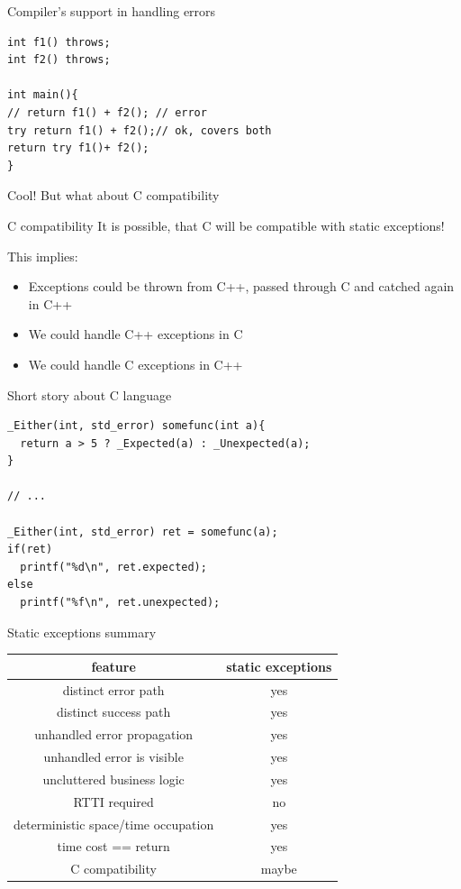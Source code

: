 \documentclass[10pt]{beamer}
\begin{document}
\begin{frame}[fragile]{Compiler's support in handling errors}
	\begin{verbatim}
int f1() throws;	
int f2() throws;

int main(){
// return f1() + f2(); // error
try return f1() + f2();// ok, covers both 
return try f1()+ f2();
}
	\end{verbatim}
\end{frame}

\begin{frame}{Cool! But what about C compatibility}
	\begin{alertblock}{C compatibility}
 		It is possible, that C will be compatible with static exceptions!
	\end{alertblock}

	
	This implies:
	
	\begin{itemize}
		\item Exceptions could be thrown from C++, passed through C and catched again in C++
		\item We could handle C++ exceptions in C
		\item We could handle C exceptions in C++
	\end{itemize}
\end{frame}

\begin{frame}[fragile]{Short story about C language}
	\begin{verbatim}
_Either(int, std_error) somefunc(int a){
  return a > 5 ? _Expected(a) : _Unexpected(a);
}

// ...

_Either(int, std_error) ret = somefunc(a);
if(ret)
  printf("%d\n", ret.expected);
else
  printf("%f\n", ret.unexpected);
	\end{verbatim}
\end{frame}

\begin{frame}{Static exceptions summary}
\centering
	\begin{tabular}{|c|c|}
		\hline
		feature & static exceptions \\ \hline \hline
		distinct error path & yes \\ \hline
		distinct success path & yes \\ \hline \hline
		unhandled error propagation & yes \\ \hline
		unhandled error is visible & yes \\ \hline
		uncluttered business logic & yes \\ \hline \hline
		RTTI required & no \\ \hline
		deterministic space/time occupation & yes \\ \hline
		time cost == return & yes \\ \hline \hline
		C compatibility & maybe \\ \hline
	\end{tabular}
\end{frame}
\end{document}
